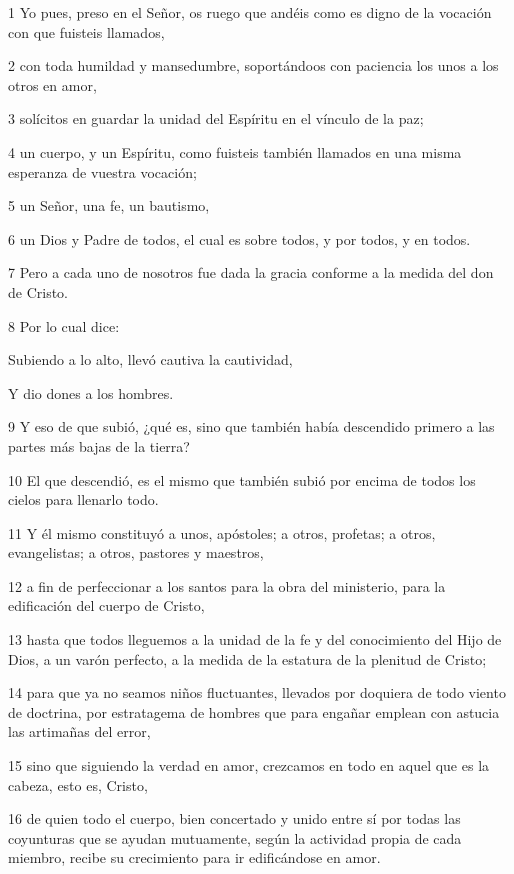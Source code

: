 \par 1 Yo pues, preso en el Señor, os ruego que andéis como es digno de la vocación con que fuisteis llamados,
\par 2 con toda humildad y mansedumbre, soportándoos con paciencia los unos a los otros en amor,
\par 3 solícitos en guardar la unidad del Espíritu en el vínculo de la paz;
\par 4 un cuerpo, y un Espíritu, como fuisteis también llamados en una misma esperanza de vuestra vocación;
\par 5 un Señor, una fe, un bautismo,
\par 6 un Dios y Padre de todos, el cual es sobre todos, y por todos, y en todos.
\par 7 Pero a cada uno de nosotros fue dada la gracia conforme a la medida del don de Cristo.
\par 8 Por lo cual dice:
\par Subiendo a lo alto, llevó cautiva la cautividad,
\par Y dio dones a los hombres.
\par 9 Y eso de que subió, ¿qué es, sino que también había descendido primero a las partes más bajas de la tierra?
\par 10 El que descendió, es el mismo que también subió por encima de todos los cielos para llenarlo todo.
\par 11 Y él mismo constituyó a unos, apóstoles; a otros, profetas; a otros, evangelistas; a otros, pastores y maestros,
\par 12 a fin de perfeccionar a los santos para la obra del ministerio, para la edificación del cuerpo de Cristo,
\par 13 hasta que todos lleguemos a la unidad de la fe y del conocimiento del Hijo de Dios, a un varón perfecto, a la medida de la estatura de la plenitud de Cristo;
\par 14 para que ya no seamos niños fluctuantes, llevados por doquiera de todo viento de doctrina, por estratagema de hombres que para engañar emplean con astucia las artimañas del error,
\par 15 sino que siguiendo la verdad en amor, crezcamos en todo en aquel que es la cabeza, esto es, Cristo,
\par 16 de quien todo el cuerpo, bien concertado y unido entre sí por todas las coyunturas que se ayudan mutuamente, según la actividad propia de cada miembro, recibe su crecimiento para ir edificándose en amor.

